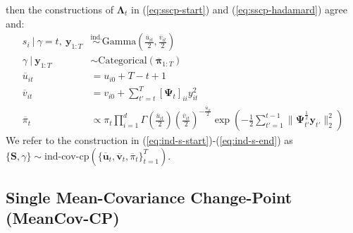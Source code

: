 then the constructions of $\boldsymbol{\Lambda}_t$ in (\ref{eq:sscp-start}) and (\ref{eq:sscp-hadamard}) agree and:
\begin{align}
    s_i \:|\: \gamma = t, \: \mathbf{y}_{1:T} &\overset{\text{ind.}}{\sim} \text{Gamma}\left(\frac{\overline{u}_{it}}{2}, \frac{\overline{v}_{it}}{2}\right) \label{eq:ind-s-start} \\
    \gamma \:|\: \mathbf{y}_{1:T}  &\sim \text{Categorical}(\overline{\boldsymbol{\pi}}_{1:T}) \\
    \overline{u}_{it} &= u_{i0} + T - t + 1 \\
    \overline{v}_{it} &= v_{i0} +  \sum_{t'=t}^{T} [\boldsymbol{\Psi}_t]_{ii} y^2_{it} \\
    \overline{\pi}_t &\propto \pi_t \prod_{i=1}^d\Gamma\left(\frac{\overline{u}_{it}}{2}\right)\left(\frac{\overline{v}_{it}}{2}\right)^{-\frac{\overline{u}_{it}}{2}}\exp\left(- \frac{1}{2}\sum_{t'=1}^{t-1} \lVert\boldsymbol{\Psi}_{t'}^{\frac{1}{2}}\mathbf{y}_{t'}\rVert_2^2\right) \label{eq:ind-s-end}
\end{align}
We refer to the construction in (\ref{eq:ind-s-start})-(\ref{eq:ind-s-end}) as $\{\mathbf{S},\gamma\} \sim \text{ind-cov-cp}(\{\overline{\mathbf{u}}_{t}, \overline{\mathbf{v}}_{t}, \overline{\pi}_t\}_{t=1}^T)$.

\subsection{Single Mean-Covariance Change-Point (MeanCov-CP)}
\label{sec:smscp}

